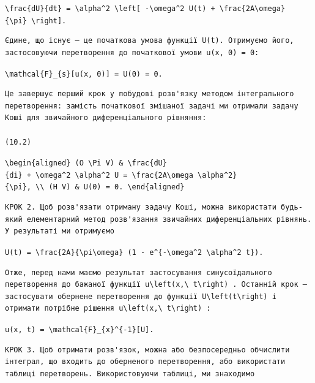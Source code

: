 \documentclass[
  ukrainian,
]{article}
\begin{document}
\texttt{\textbackslash{}frac\{dU\}\{dt\}\ =\ \textbackslash{}alpha\^{}2\ \textbackslash{}left{[}\ -\textbackslash{}omega\^{}2\ U(t)\ +\ \textbackslash{}frac\{2A\textbackslash{}omega\}\{\textbackslash{}pi\}\ \textbackslash{}right{]}.}

\begin{verbatim}
Єдине, що існує — це початкова умова функції U(t). Отримуємо його, застосовуючи перетворення до початкової умови u(x, 0) = 0:
\end{verbatim}

\texttt{\textbackslash{}mathcal\{F\}\_\{s\}{[}u(x,\ 0){]}\ =\ U(0)\ =\ 0.}

\begin{verbatim}
Це завершує перший крок у побудові розв'язку методом інтегрального перетворення: замість початкової змішаної задачі ми отримали задачу Коші для звичайного диференціального рівняння:

(10.2)
\end{verbatim}

\texttt{\textbackslash{}begin\{aligned\}\ (O\ \textbackslash{}Pi\ V)\ \&\ \textbackslash{}frac\{dU\}\{di\}\ +\ \textbackslash{}omega\^{}2\ \textbackslash{}alpha\^{}2\ U\ =\ \textbackslash{}frac\{2A\textbackslash{}omega\ \textbackslash{}alpha\^{}2\}\{\textbackslash{}pi\},\ \textbackslash{}\textbackslash{}\ (H\ V)\ \&\ U(0)\ =\ 0.\ \textbackslash{}end\{aligned\}}

\begin{verbatim}
КРОК 2. Щоб розв'язати отриману задачу Коші, можна використати будь-який елементарний метод розв'язання звичайних диференціальних рівнянь. У результаті ми отримуємо
\end{verbatim}

\texttt{U(t)\ =\ \textbackslash{}frac\{2A\}\{\textbackslash{}pi\textbackslash{}omega\}\ (1\ -\ e\^{}\{-\textbackslash{}omega\^{}2\ \textbackslash{}alpha\^{}2\ t\}).}

\begin{verbatim}
Отже, перед нами маємо результат застосування синусоїдального перетворення до бажаної функції u\left(x,\ t\right) . Останній крок — застосувати обернене перетворення до функції U\left(t\right) і отримати потрібне рішення u\left(x,\ t\right) :
\end{verbatim}

\texttt{u(x,\ t)\ =\ \textbackslash{}mathcal\{F\}\_\{x\}\^{}\{-1\}{[}U{]}.}

\begin{verbatim}
КРОК 3. Щоб отримати розв'язок, можна або безпосередньо обчислити інтеграл, що входить до оберненого перетворення, або використати таблиці перетворень. Використовуючи таблиці, ми знаходимо
\end{verbatim}
\end{document}
